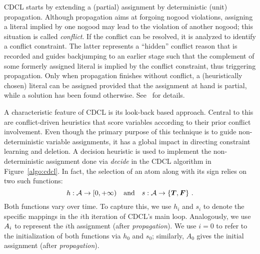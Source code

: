 CDCL starts by extending a (partial) {assignment} by deterministic (unit) propagation.
Although propagation aims at forgoing nogood violations,
assigning a literal implied by one nogood may lead to the violation of another nogood;
this situation is called \emph{conflict}.
If the conflict can be resolved, %
it is analyzed to identify a conflict constraint.
The latter represents a ``hidden'' conflict reason that is recorded and
guides backjumping to an earlier stage such that
the complement of some formerly assigned literal is implied by the conflict constraint,
thus triggering propagation.
Only when propagation finishes without conflict,
a (heuristically chosen) literal can be assigned %
provided that the assignment at hand is partial,
while a {solution} %
has been found otherwise.
%
See~\cite{SATHandbook} for details.

A characteristic feature of CDCL is its look-back based approach.
Central to this are conflict-driven heuristics that score variables according to their prior conflict involvement.
Even though the primary purpose of this technique is to guide non-deterministic variable assignments,
it has a global impact in directing constraint learning and deletion.
%
A decision heuristic is used to implement the non-deterministic assignment done via
\emph{decide} in the CDCL algorithm in Figure~\ref{algo:cdcl}.
In fact,
the selection of an atom along with its sign relies on two such functions:
\[
h: \mathcal{A}\to[0,+\infty)
\quad\text{and}\quad
s: \mathcal{A}\to\{\boldsymbol{T},\boldsymbol{F}\}
\ .
\]
Both functions vary over time.
To capture this, we use $h_i$ and $s_i$ to denote the specific mappings in the $i$th iteration of CDCL's main loop.
Analogously, we use $A_i$ to represent the $i$th assignment (after \textit{propagation}).
We use $i=0$ to refer to the initialization of both functions via $h_0$ and $s_0$;
similarly, $A_0$ gives the initial assignment (after \textit{propagation}).

